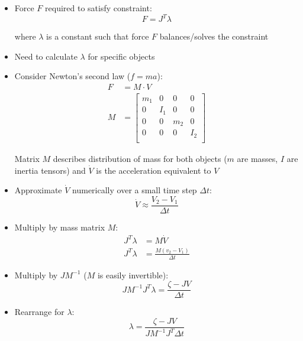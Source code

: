 \documentclass[a4paper]{article}
\begin{document}
\begin{itemize}
  \item
    Force $F$ required to satisfy constraint:
    \[
      F = J^{T} \lambda
    \]

    where $\lambda$ is a constant such that force $F$ balances/solves the
    constraint

  \item
    Need to calculate $\lambda$ for specific objects

  \item
    Consider Newton's second law ($f = ma$):
    \begin{align*}
      F &= M \cdot V \\
      M &= \left[
              \begin{array}{cccc}
                m_{1} & 0     & 0     & 0     \\
                0     & I_{1} & 0     & 0     \\
                0     & 0     & m_{2} & 0     \\
                0     & 0     & 0     & I_{2} \\
              \end{array}
           \right]
    \end{align*}

    Matrix $M$ describes distribution of mass for both objects ($m$ are masses,
    $I$ are inertia tensors) and $\dot V$ is the acceleration equivalent to $V$

  \item
    Approximate $\dot V$ numerically over a small time step $\Delta t$:
    \[
      \dot V \approx \frac{V_{2} - V_{1}}{\Delta t}
    \]

  \item
    Multiply by mass matrix $M$:
    \begin{align*}
      J^{T} \lambda &= M \dot V \\
      J^{T} \lambda &= \frac{M(v_{2} - V_{1})}{\Delta t}
    \end{align*}

  \item
    Multiply by $J M^{-1}$ ($M$ is easily invertible):
    \[
      J M^{-1} J^{T} \lambda = \frac{\zeta - J V}{\Delta t}
    \]

  \item
    Rearrange for $\lambda$:
    \[
      \lambda = \frac{\zeta - J V}{J M^{-1} J^{T} \Delta t}
    \]

\end{itemize}
\end{document}
